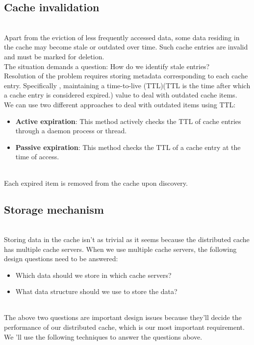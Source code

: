 \subsection{Cache invalidation}\label{bY-jXZXUUXz1waRCNhuly}
\\
Apart from the eviction of less frequently accessed data, some data residing in the cache may become stale or outdated over time. Such cache entries are invalid and must be marked for deletion.
\\
The situation demands a question: How do we identify stale entries?
\\
Resolution of the problem requires storing metadata corresponding to each cache entry. Specifically , maintaining a time-to-live (TTL)(TTL is the time after which a cache entry is considered expired.) value to deal with outdated cache items.
\\
We can use two different approaches to deal with outdated items using TTL:

\begin{itemize}
\item
\protect{}\label{yZepxwsJ51R_woGdGpTpd}
\textbf{Active expiration}: This method actively checks the TTL of cache entries through a daemon process or thread.
\item
\protect{}\label{R7gIIGSHeRhOK19-x7ZMl}
\textbf{Passive expiration}: This method checks the TTL of a cache entry at the time of access.
\end{itemize}
\\
Each expired item is removed from the cache upon discovery.

\subsection{Storage mechanism}\label{nGlGaNp5StJXUhen_u8WE}
\\
Storing data in the cache isn't as trivial as it seems because the distributed cache has multiple cache servers. When we use multiple cache servers, the following design questions need to be answered:

\begin{itemize}
\item
\protect{}\label{Brg6eYrXM2Njzqxgq__Va}
Which data should we store in which cache servers?
\item
\protect{}\label{xOJ7p1DIphR24B1f0_fP0}
What data structure should we use to store the data?
\end{itemize}
\\
The above two questions are important design issues because they'll decide the performance of our distributed cache, which is our most important requirement. We 'll use the following techniques to answer the questions above.

